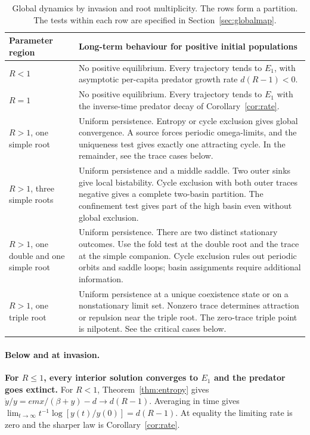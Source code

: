 \documentclass[12pt,a4paper,twoside,fleqn]{article}
\theoremstyle{journal}
\newcommand{\claim}[1]{{\normalfont\bfseries\boldmath #1}}
\begin{document}
\begin{table}[tbp]\centering\small
\caption{Global dynamics by invasion and root multiplicity. The rows form a partition. The tests within each row are specified in Section~\ref{sec:globalmap}.}
\label{tab:global}
\begin{tabularx}{\linewidth}{@{}p{.24\linewidth}Y@{}}\toprule
Parameter region & Long-term behaviour for positive initial populations\\ \midrule
\(R<1\) & No positive equilibrium. Every trajectory tends to \(E_1\), with asymptotic per-capita predator growth rate \(d(R-1)<0\).\\
\(R=1\) & No positive equilibrium. Every trajectory tends to \(E_1\) with the inverse-time predator decay of Corollary~\ref{cor:rate}.\\
\(R>1\), one simple root & Uniform persistence. Entropy or cycle exclusion gives global convergence. A source forces periodic omega-limits, and the uniqueness test gives exactly one attracting cycle. In the remainder, see the trace cases below.\\
\(R>1\), three simple roots & Uniform persistence and a middle saddle. Two outer sinks give local bistability. Cycle exclusion with both outer traces negative gives a complete two-basin partition. The confinement test gives part of the high basin even without global exclusion.\\
\(R>1\), one double and one simple root & Uniform persistence. There are two distinct stationary outcomes. Use the fold test at the double root and the trace at the simple companion. Cycle exclusion rules out periodic orbits and saddle loops; basin assignments require additional information.\\
\(R>1\), one triple root & Uniform persistence at a unique coexistence state or on a nonstationary limit set. Nonzero trace determines attraction or repulsion near the triple root. The zero-trace triple point is nilpotent. See the critical cases below.\\
\bottomrule\end{tabularx}
\end{table}

\paragraph{Below and at invasion.}
\claim{For \(R\le1\), every interior solution converges to \(E_1\) and the predator goes extinct.} For \(R<1\), Theorem~\ref{thm:entropy} gives \(\dot y/y=emx/(\beta+y)-d\to d(R-1)\). Averaging in time gives \(\lim_{t\to\infty}t^{-1}\log[y(t)/y(0)]=d(R-1)\). At equality the limiting rate is zero and the sharper law is Corollary~\ref{cor:rate}.
\end{document}
